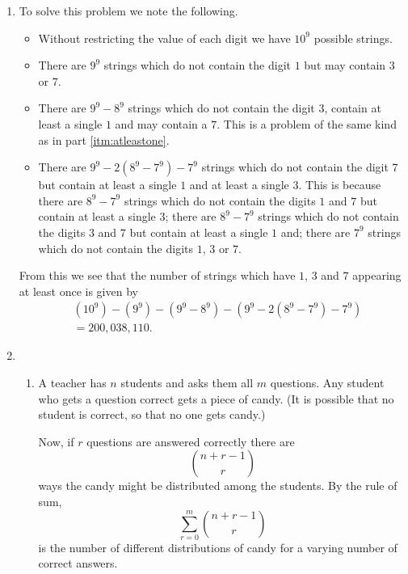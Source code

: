 \documentclass[a4paper,11pt]{article}
\begin{document}
\begin{enumerate}
		\item To solve this problem we note the following.
		\begin{itemize}
			\item Without restricting the value of each digit we have $10^9$ possible strings.
			\item There are $9^9$ strings which do not contain the digit $1$ but may contain $3$ or $7$.
			\item There are $9^9 - 8^9$ strings which do not contain the digit $3$, contain at least a single $1$ and may contain a $7$. This is a problem of the same kind as in part \ref{itm:atleastone}.
			\item There are $9^9 - 2(8^9 - 7^9) - 7^9$ strings which do not contain the digit $7$ but contain at least a single $1$ and at least a single $3$. This is because there are $8^9 - 7^9$ strings which do not contain the digits $1$ and $7$ but contain at least a single $3$; there are $8^9 - 7^9$ strings which do not contain the digits $3$ and $7$ but contain at least a single $1$ and; there are $7^9$ strings which do not contain the digits $1$, $3$ or $7$.
		\end{itemize}
		From this we see that the number of strings which have $1$, $3$ and $7$ appearing at least once is given by
		\begin{align*}
			& \left( 10^9 \right) - \left( 9^9 \right) - \left( 9^9 - 8^9 \right) - \left( 9^9 - 2(8^9 - 7^9) - 7^9 \right) \\
			&= 200,038,110.
		\end{align*}
		
		\item
		\begin{enumerate}
			\item A teacher has $n$ students and asks them all $m$ questions. Any student who gets a question correct gets a piece of candy. (It is possible that no student is correct, so that no one gets candy.)
			
			Now, if $r$ questions are answered correctly there are
			\begin{equation*}
				\binom{n + r - 1}{r}
			\end{equation*}
			ways the candy might be distributed among the students. By the rule of sum,
			\begin{equation*}
				\sum\limits_{r=0}^{m} \binom{n + r - 1}{r}
			\end{equation*}
			is the number of different distributions of candy for a varying number of correct answers.
			

\end{enumerate}
\end{enumerate}
\end{document}
